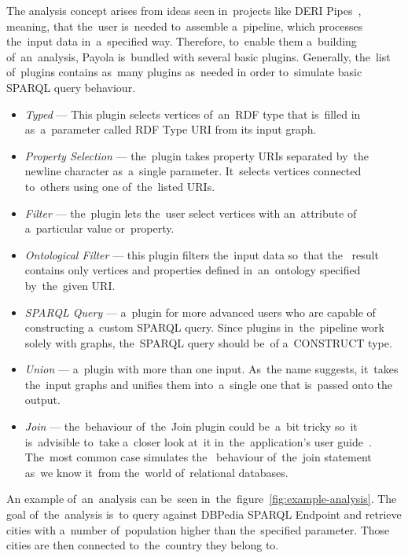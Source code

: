 The analysis concept arises from ideas seen in~projects like DERI 
Pipes~\cite{deri-pipes}, meaning, that the~user is~needed to~assemble a~pipeline,
which processes the~input data in~a~specified way. Therefore, to~enable them a~building of~an~analysis, Payola is~bundled with several basic 
plugins. Generally, the~list of~plugins contains as~many plugins as~needed
in order to~simulate basic SPARQL query behaviour.

\begin{itemize}
  \item \emph{Typed} --- This plugin selects vertices of~an~RDF type that is~filled in
  as~a~parameter called RDF Type URI from its input graph.
  
  \item \emph{Property Selection} --- the~plugin takes property URIs separated by~the
  newline character as~a~single parameter. It~selects vertices connected
  to~others using one of~the~listed URIs.
  
  \item \emph{Filter} --- the~plugin lets the~user select vertices with an~attribute of
  a~particular value or~property.
 
  \item \emph{Ontological Filter} --- this plugin filters the~input data so~that the~  result contains only vertices and properties defined in~an~ontology specified 
  by~the~given URI.
  
  \item \emph{SPARQL Query} --- a~plugin for more advanced users who are capable of~  constructing a~custom SPARQL query. Since plugins in~the~pipeline work solely with 
  graphs, the~SPARQL query should be~of a~CONSTRUCT type.
  
  \item \emph{Union} --- a~plugin with more than one input. As~the name suggests, it~takes 
  the~input graphs and unifies them into~a~single one that is~passed onto the~  output.
  
  \item \emph{Join} --- the~behaviour of~the~Join plugin could be~a~bit tricky so~it is~advisible
  to~take a~closer look at~it in~the~application's 
  user guide~\cite{payola:ug:join-plugin}. The~most common case simulates the~  behaviour of~the~join statement as~we know it~from the~world of~relational 
  databases.
  
\end{itemize}

An example of~an~analysis can be~seen in~the~figure~\ref{fig:example-analysis}.
The goal of~the~analysis is~to query against DBPedia SPARQL Endpoint and 
retrieve cities with a~number of~population higher than the~specified parameter. 
Those cities are then connected to~the~country they belong to.

